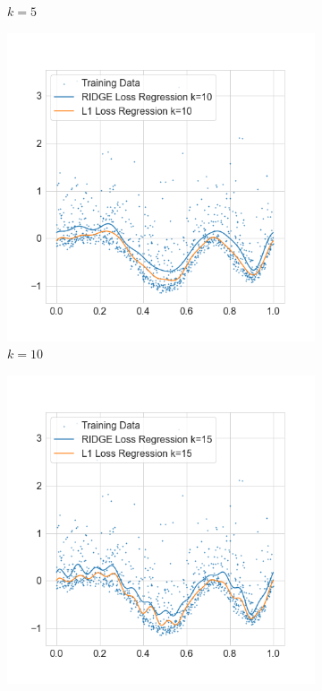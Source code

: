 \documentclass{./tufte-handout}
\begin{document}
\begin{enumerate}[(a)]
\begin{enumerate}
\begin{figure}[!ht]
\begin{subfigure}[b]{.5\textwidth}
          \caption{$k=5$}
        \end{subfigure}
        \begin{subfigure}[b]{.5\textwidth}
          \centering
          \includegraphics[width=1.2\linewidth]{../figures/l1_vs_ridge_regression_k_10.png}
          \caption{$k=10$}
        \end{subfigure}%
        \hfill
        \begin{subfigure}[b]{.5\textwidth}
          \centering
          \includegraphics[width=1.2\linewidth]{../figures/l1_vs_ridge_regression_k_15.png}

\end{subfigure}
\end{figure}
\end{enumerate}
\end{enumerate}
\end{document}
